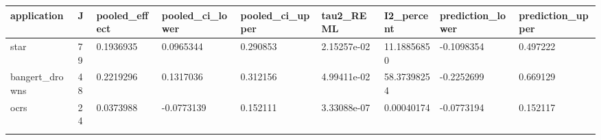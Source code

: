 \begin{longtable}{lllllllll}
\toprule
application & J & pooled\_effect & pooled\_ci\_lower & pooled\_ci\_upper & tau2\_REML & I2\_percent & prediction\_lower & prediction\_upper \\
\midrule\endhead
star & 79 & 0.1936935 & 0.0965344 & 0.290853 & 2.15257e-02 & 11.18856850 & -0.1098354 & 0.497222 \\ \addlinespace[3pt]
bangert\_drowns & 48 & 0.2219296 & 0.1317036 & 0.312156 & 4.99411e-02 & 58.37398254 & -0.2252699 & 0.669129 \\ \addlinespace[3pt]
ocrs & 24 & 0.0373988 & -0.0773139 & 0.152111 & 3.33088e-07 & 0.00040174 & -0.0773194 & 0.152117 \\ \addlinespace[3pt]
\bottomrule\end{longtable}
